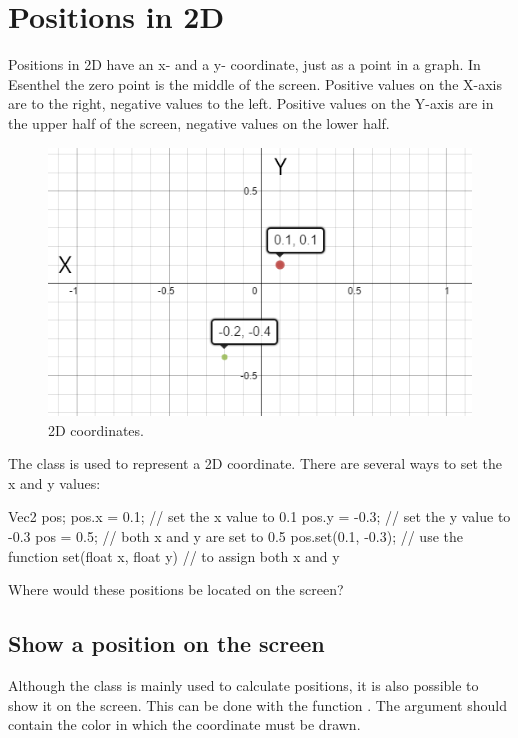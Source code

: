 \chapter{Positions in 2D}
\label{chapter:positions}

Positions in 2D have an x- and a y- coordinate, just as a point in a graph. In Esenthel the zero point is the middle of the screen. Positive values on the X-axis are to the right, negative values to the left. Positive values on the Y-axis are in the upper half of the screen, negative values on the lower half.

\begin{figure}[h]
\centering
\includegraphics[width=0.7\linewidth]{images/2Dpositions.png}
\caption[]{2D coordinates.}
\label{fig:pos2D}
\end{figure}

The class  is used to represent a 2D coordinate. There are several ways to set the x and y values:

\begin{code}
Vec2 pos;
pos.x =  0.1;       // set the x value to  0.1
pos.y = -0.3;       // set the y value to -0.3
pos   =  0.5;       // both x and y are set to 0.5
pos.set(0.1, -0.3); // use the function set(float x, float y) 
                    // to assign both x and y
\end{code}

\begin{exercise}
Where would these positions be located on the screen?
\end{exercise}


\section{Show a position on the screen}

Although the class  is mainly used to calculate positions, it is also possible to show it on the screen. This can be done with the function . The argument should contain the color in which the coordinate must be drawn.


